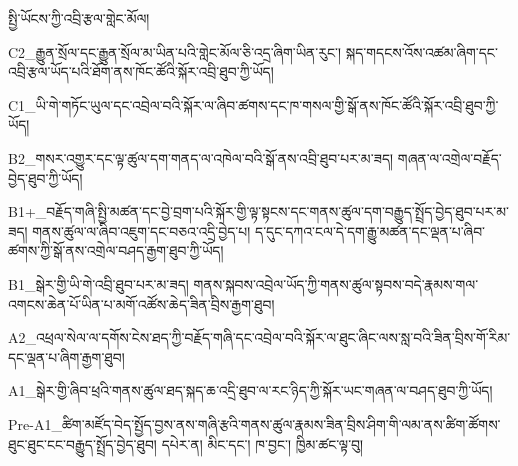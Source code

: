 སྤྱི་ཡོངས་ཀྱི་འབྲི་རྩལ་གླེང་མོལ།

C2_རྒྱུན་སྲོལ་དང་རྒྱུན་སྲོལ་མ་ཡིན་པའི་གླེང་མོལ་ཅི་འདྲ་ཞིག་ཡིན་རུང་། སྐད་གདངས་འོས་འཚམ་ཞིག་དང་འབྲི་རྩལ་ཡོད་པའི་ཐོག་ནས་ཁོང་ཚོའི་སྐོར་འབྲི་ཐུབ་ཀྱི་ཡོད།

C1_ཡི་གེ་གཏོང་ཡུལ་དང་འབྲེལ་བའི་སྐོར་ལ་ཞིབ་ཚགས་དང་ཁ་གསལ་གྱི་སྒོ་ནས་ཁོང་ཚོའི་སྐོར་འབྲི་ཐུབ་ཀྱི་ཡོད།

B2_གསར་འགྱུར་དང་ལྟ་ཚུལ་དག་གནད་ལ་འཁེལ་བའི་སྒོ་ནས་འབྲི་ཐུབ་པར་མ་ཟད། གཞན་ལ་འགྲེལ་བརྗོད་བྱེད་ཐུབ་ཀྱི་ཡོད།

B1+_བརྗོད་གཞི་སྤྱི་མཚན་དང་བྱེ་བྲག་པའི་སྐོར་གྱི་ལྟ་སྟངས་དང་གནས་ཚུལ་དག་བརྒྱུད་སྤྲོད་བྱེད་ཐུབ་པར་མ་ཟད། གནས་ཚུལ་ལ་ཞིབ་འཇུག་དང་བཅའ་འདྲི་བྱེད་པ། ད་དུང་དཀའ་ངལ་དེ་དག་རྒྱུ་མཚན་དང་ལྡན་པ་ཞིབ་ཚགས་ཀྱི་སྒོ་ནས་འགྲེལ་བཤད་རྒྱག་ཐུབ་ཀྱི་ཡོད། 

B1_སྒེར་གྱི་ཡི་གེ་འབྲི་ཐུབ་པར་མ་ཟད།
གནས་སྐབས་འབྲེལ་ཡོད་ཀྱི་གནས་ཚུལ་སྟབས་བདེ་རྣམས་གལ་འགངས་ཆེན་པོ་ཡིན་པ་མགོ་འཚོས་ཆེད་ཟིན་བྲིས་རྒྱག་ཐུབ།

A2_འཕྲལ་སེལ་ལ་དགོས་ངེས་ཐད་ཀྱི་བརྗོད་གཞི་དང་འབྲེལ་བའི་སྐོར་ལ་ཐུང་ཞིང་ལས་སླ་བའི་ཟིན་བྲིས་གོ་རིམ་དང་ལྡན་པ་ཞིག་རྒྱག་ཐུབ།

A1_སྒེར་གྱི་ཞིབ་ཕྲའི་གནས་ཚུལ་ཐད་སྐད་ཆ་འདྲི་ཐུབ་ལ་རང་ཉིད་ཀྱི་སྐོར་ཡང་གཞན་ལ་བཤད་ཐུབ་ཀྱི་ཡོད།

Pre-A1_ཚིག་མཛོད་བེད་སྤྱོད་བྱས་ནས་གཞི་རྩའི་གནས་ཚུལ་རྣམས་ཟིན་བྲིས་ཤིག་གི་ལམ་ནས་ཚིག་ཚོགས་ཐུང་ཐུང་ངང་བརྒྱུད་སྤྲོད་བྱེད་ཐུབ། དཔེར་ན། མིང་དང་། ཁ་བྱང་། ཁྱིམ་ཚང་ལྟ་བུ། 
